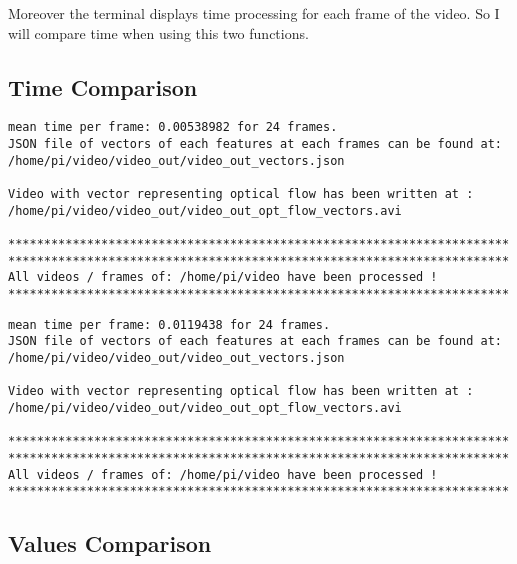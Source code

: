 Moreover the terminal displays time processing for each frame of the video. So I will compare time when using this two functions.


\subsection{Time Comparison}

\begin{lstlisting}
mean time per frame: 0.00538982 for 24 frames.
JSON file of vectors of each features at each frames can be found at: /home/pi/video/video_out/video_out_vectors.json

Video with vector representing optical flow has been written at : /home/pi/video/video_out/video_out_opt_flow_vectors.avi

**********************************************************************
**********************************************************************
All videos / frames of: /home/pi/video have been processed !
**********************************************************************
\end{lstlisting}


\begin{lstlisting}
mean time per frame: 0.0119438 for 24 frames.
JSON file of vectors of each features at each frames can be found at: /home/pi/video/video_out/video_out_vectors.json

Video with vector representing optical flow has been written at : /home/pi/video/video_out/video_out_opt_flow_vectors.avi

**********************************************************************
**********************************************************************
All videos / frames of: /home/pi/video have been processed !
**********************************************************************
\end{lstlisting}



\subsection{Values Comparison}

